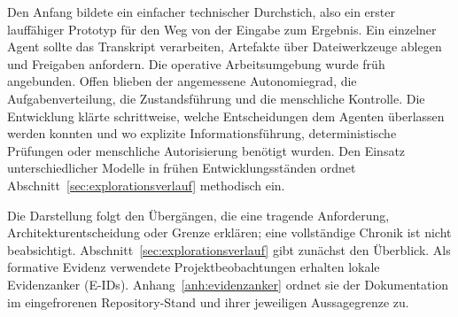 Den Anfang bildete ein einfacher technischer Durchstich, also ein
erster lauffähiger Prototyp für den Weg von der Eingabe zum Ergebnis.
Ein einzelner Agent sollte das Transkript verarbeiten, Artefakte über
Dateiwerkzeuge ablegen und Freigaben anfordern. Die operative
Arbeitsumgebung wurde früh angebunden. Offen blieben der angemessene
Autonomiegrad, die Aufgabenverteilung, die Zustandsführung und die
menschliche Kontrolle. Die Entwicklung klärte schrittweise, welche
Entscheidungen dem Agenten überlassen werden konnten und wo explizite
Informationsführung, deterministische Prüfungen oder menschliche
Autorisierung benötigt wurden. Den Einsatz unterschiedlicher Modelle in frühen Entwicklungsständen
ordnet Abschnitt~\ref{sec:explorationsverlauf} methodisch ein.

Die Darstellung folgt den Übergängen, die eine tragende Anforderung,
Architekturentscheidung oder Grenze erklären; eine vollständige Chronik
ist nicht beabsichtigt. Abschnitt~\ref{sec:explorationsverlauf} gibt
zunächst den Überblick. Als formative Evidenz verwendete
Projektbeobachtungen erhalten lokale Evidenzanker (E-IDs).
Anhang~\ref{anh:evidenzanker} ordnet sie der Dokumentation im
eingefrorenen Repository-Stand und ihrer jeweiligen Aussagegrenze zu.
